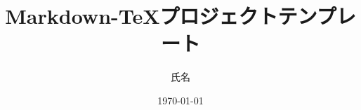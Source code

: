 \title{Markdown-TeXプロジェクトテンプレート}
\author{氏名}
\date{\today}


  \maketitle
  
  \tableofcontents
  
  
